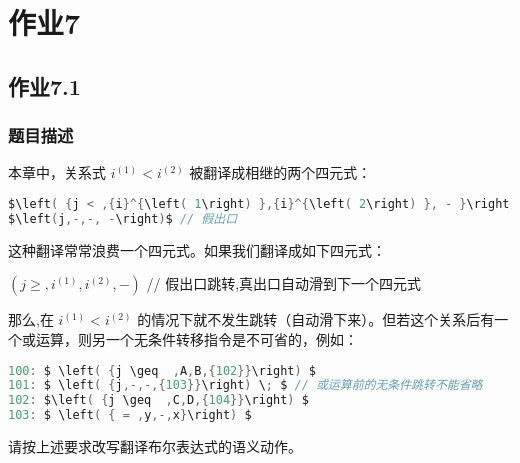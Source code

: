 
\section{作业7}
\subsection{作业7.1}
\subsubsection{题目描述}

本章中，关系式 $ {i}^{\left( 1\right) } < {i}^{\left( 2\right) } $ 被翻译成相继的两个四元式：

\begin{lstlisting}[language=c,title={${i}^{\left( 1\right) } < {i}^{\left( 2\right) }$},mathescape=true]
$\left( {j < ,{i}^{\left( 1\right) },{i}^{\left( 2\right) }, - }\right)$ // 真出口
$\left(j,-,-, -\right)$ // 假出口
\end{lstlisting}


这种翻译常常浪费一个四元式。如果我们翻译成如下四元式：

$ \left( {j \geq  ,{i}^{\left( 1\right) },{i}^{\left( 2\right) }, - }\right) $ // 假出口跳转,真出口自动滑到下一个四元式

那么,在 $ {i}^{\left( 1\right) } < {i}^{\left( 2\right) } $ 的情况下就不发生跳转（自动滑下来）。但若这个关系后有一个或运算，则另一个无条件转移指令是不可省的，例如：

\begin{lstlisting}[language=c,title={if $A < B \vee  C < D$ then $x = y$},mathescape=true]
100: $ \left( {j \geq  ,A,B,{102}}\right) $
101: $ \left( {j,-,-,{103}}\right) \; $ // 或运算前的无条件跳转不能省略
102: $\left( {j \geq  ,C,D,{104}}\right) $
103: $ \left( { = ,y,-,x}\right) $
\end{lstlisting}

请按上述要求改写翻译布尔表达式的语义动作。
